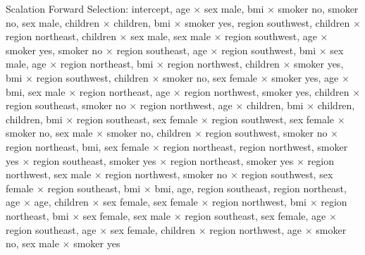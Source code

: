 \documentclass{article}
\begin{document}
Scalation Forward Selection: intercept, age $\times$ sex male, bmi $\times$ smoker no, smoker no, sex male, children $\times$ children, bmi $\times$ smoker yes, region southwest, children $\times$ region northeast, children $\times$ sex male, sex male $\times$ region southwest, age $\times$ smoker yes, smoker no $\times$ region southeast, age $\times$ region southwest, bmi $\times$ sex male, age $\times$ region northeast, bmi $\times$ region northwest, children $\times$ smoker yes, bmi $\times$ region southwest, children $\times$ smoker no, sex female $\times$ smoker yes, age $\times$ bmi, sex male $\times$ region northeast, age $\times$ region northwest, smoker yes, children $\times$ region southeast, smoker no $\times$ region northwest, age $\times$ children, bmi $\times$ children, children, bmi $\times$ region southeast, sex female $\times$ region southwest, sex female $\times$ smoker no, sex male $\times$ smoker no, children $\times$ region southwest, smoker no $\times$ region northeast, bmi, sex female $\times$ region northeast, region northwest, smoker yes $\times$ region southeast, smoker yes $\times$ region northeast, smoker yes $\times$ region northwest, sex male $\times$ region northwest, smoker no $\times$ region southwest, sex female $\times$ region southeast, bmi $\times$ bmi, age, region southeast, region northeast, age $\times$ age, children $\times$ sex female, sex female $\times$ region northwest, bmi $\times$ region northeast, bmi $\times$ sex female, sex male $\times$ region southeast, sex female, age $\times$ region southeast, age $\times$ sex female, children $\times$ region northwest, age $\times$ smoker no, sex male $\times$ smoker yes
\end{document}
